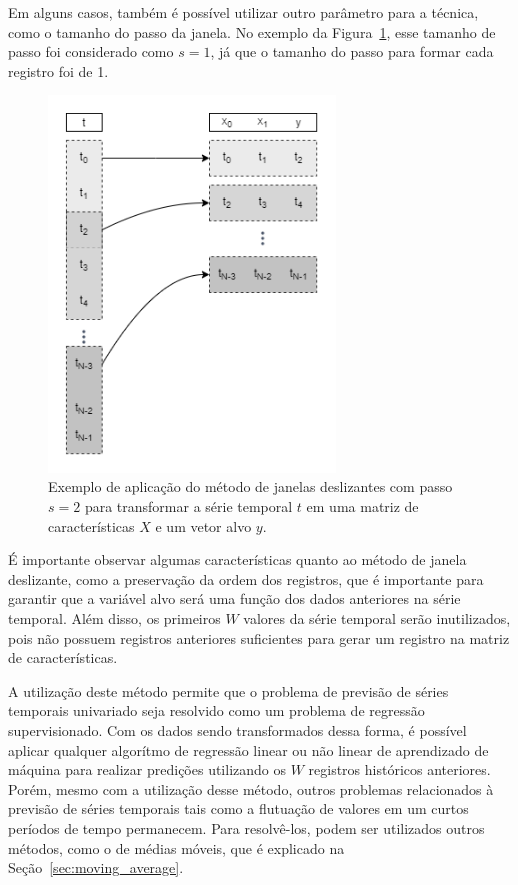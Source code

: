 Em alguns casos, também é possível utilizar outro parâmetro para a técnica, como o tamanho do passo da janela. No exemplo da Figura~\ref{fig:sliding_window_2}, esse tamanho de passo foi considerado como $s=1$, já que o tamanho do passo para formar cada registro foi de 1.

\begin{figure}[!htp]
    \centering
    \includegraphics[width=3.0in]{img/sliding_window_2.png}
    \caption{Exemplo de aplicação do método de janelas deslizantes com passo $s=2$  para transformar a série temporal $t$ em uma matriz de características $X$ e um vetor alvo $y$. }
    \label{fig:sliding_window_2}
\end{figure}

É importante observar algumas características quanto ao método de janela deslizante, como a preservação da ordem dos registros, que é importante para garantir que a variável alvo será uma função dos dados anteriores na série temporal. Além disso, os primeiros $W$ valores da série temporal serão inutilizados, pois não possuem registros anteriores suficientes para gerar um registro na matriz de características.

A utilização deste método permite que o problema de previsão de séries temporais univariado seja resolvido como um problema de regressão supervisionado. Com os dados sendo transformados dessa forma, é possível aplicar qualquer algorítmo de regressão linear ou não linear de aprendizado de máquina para realizar predições utilizando os $W$ registros históricos anteriores. Porém, mesmo com a utilização desse método, outros problemas relacionados à previsão de séries temporais tais como a flutuação de valores em um curtos períodos de tempo permanecem. Para resolvê-los, podem ser utilizados outros métodos, como o de médias móveis, que é explicado na Seção~\ref{sec:moving_average}.

